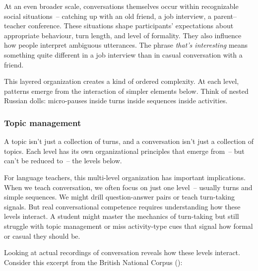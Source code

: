 At an even broader scale, conversations themselves occur within recognizable social situations~-- catching up with an old friend, a job interview, a parent--teacher conference. These situations shape participants' expectations about appropriate behaviour, turn length, and level of formality. They also influence how people interpret ambiguous utterances. The phrase \textit{that's interesting} means something quite different in a job interview than in casual conversation with a friend.

This layered organization creates a kind of ordered complexity. At each level, patterns emerge from the interaction of simpler elements below. Think of nested Russian dolls: micro-pauses inside turns inside sequences inside activities.

\subsubsection{Topic management}\label{sssec:topic-man}

A topic isn't just a collection of turns, and a conversation isn't just a collection of topics. Each level has its own organizational principles that emerge from~-- but can't be reduced to~-- the levels below.

For language teachers, this multi-level organization has important implications. When we teach conversation, we often focus on just one level~-- usually turns and simple sequences. We might drill question-answer pairs or teach turn-taking signals. But real conversational competence requires understanding how these levels interact. A student might master the mechanics of turn-taking but still struggle with topic management or miss activity-type cues that signal how formal or casual they should be.

Looking at actual recordings of conversation reveals how these levels interact. Consider this excerpt from the British National Corpus (\citeyear{BNC_KC8}):

